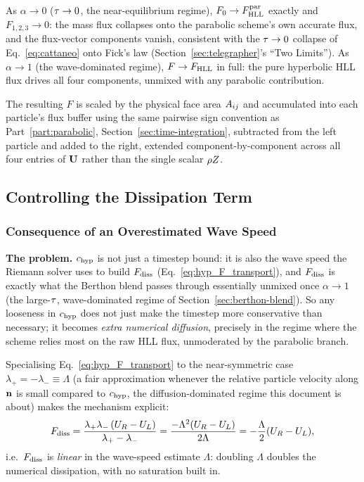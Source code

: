 As $\alpha\to0$ ($\tau\to0$, the near-equilibrium regime), $F_0\to
F_{\rm HLL}^{\rm par}$ exactly and $F_{1,2,3}\to0$: the mass flux
collapses onto the parabolic scheme's own accurate flux, and the
flux-vector components vanish, consistent with the $\tau\to0$
collapse of Eq.~\eqref{eq:cattaneo} onto Fick's law
(Section~\ref{sec:telegrapher}'s ``Two Limits''). As $\alpha\to1$ (the
wave-dominated regime), $F\to F_{\rm HLL}$ in full: the pure hyperbolic
HLL flux drives all four components, unmixed with any parabolic
contribution.

The resulting $F$ is scaled by the physical face area $A_{ij}$ and
accumulated into each particle's flux buffer using the same pairwise
sign convention as Part~\ref{part:parabolic},
Section~\ref{sec:time-integration}, subtracted from the left particle and
added to the right, extended component-by-component across all four
entries of $\mathbf{U}$ rather than the single scalar $\rho Z$.

\subsection{Controlling the Dissipation Term}
\label{sec:controlling-dissipation}

\subsubsection{Consequence of an Overestimated Wave Speed}
\label{sec:hll-consequence}

\textbf{The problem.} $c_{\rm hyp}$ is not just a timestep bound: it is also
the wave speed the Riemann solver uses to build $F_{\rm diss}$
(Eq.~\eqref{eq:hyp_F_transport}), and $F_{\rm diss}$ is exactly what the
Berthon blend passes through essentially unmixed once $\alpha\to1$ (the
large-$\tau$, wave-dominated regime of
Section~\ref{sec:berthon-blend}). So any looseness in $c_{\rm hyp}$ does not
just make the timestep more conservative than necessary; it becomes
\emph{extra numerical diffusion}, precisely in the regime where the
scheme relies most on the raw HLL flux, unmoderated by the parabolic
branch.

Specialising Eq.~\eqref{eq:hyp_F_transport} to the near-symmetric case
$\lambda_+=-\lambda_-\equiv\Lambda$ (a fair approximation whenever the
relative particle velocity along $\mathbf{n}$ is small compared to $c_{\rm hyp}$,
the diffusion-dominated regime this document is about) makes the
mechanism explicit:
\begin{equation}
  F_{\rm diss} = \frac{\lambda_+\lambda_-\,(U_R-U_L)}{\lambda_+-\lambda_-}
  = \frac{-\Lambda^2(U_R-U_L)}{2\Lambda} = -\frac{\Lambda}{2}(U_R-U_L) ,
\end{equation}
i.e.\ $F_{\rm diss}$ is \emph{linear} in the wave-speed estimate
$\Lambda$: doubling $\Lambda$ doubles the numerical dissipation, with no
saturation built in.

